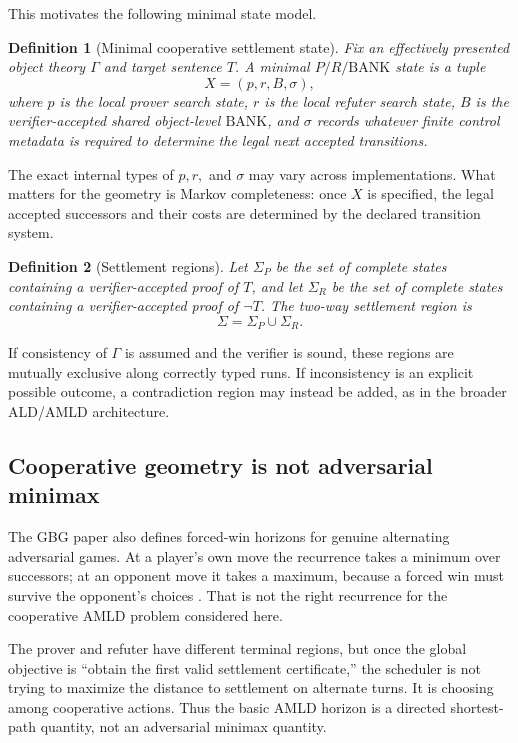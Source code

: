 \documentclass[11pt]{article}
\newtheorem{definition}{Definition}[section]
\theoremstyle{remark}
\newcommand{\BANK}{\ensuremath{\mathrm{BANK}}}
\begin{document}
This motivates the following minimal state model.

\begin{definition}[Minimal cooperative settlement state]
Fix an effectively presented object theory $\Gamma$ and target sentence $T$. A minimal $P/R/\BANK$ state is a tuple
\[
X=(p,r,B,\sigma),
\]
where $p$ is the local prover search state, $r$ is the local refuter search state, $B$ is the verifier-accepted shared object-level \BANK, and $\sigma$ records whatever finite control metadata is required to determine the legal next accepted transitions.
\end{definition}

The exact internal types of $p,r,$ and $\sigma$ may vary across implementations. What matters for the geometry is Markov completeness: once $X$ is specified, the legal accepted successors and their costs are determined by the declared transition system.

\begin{definition}[Settlement regions]
Let $\Sigma_P$ be the set of complete states containing a verifier-accepted proof of $T$, and let $\Sigma_R$ be the set of complete states containing a verifier-accepted proof of $\neg T$. The two-way settlement region is
\[
\Sigma=\Sigma_P\cup\Sigma_R.
\]
\end{definition}

If consistency of $\Gamma$ is assumed and the verifier is sound, these regions are mutually exclusive along correctly typed runs. If inconsistency is an explicit possible outcome, a contradiction region may instead be added, as in the broader ALD/AMLD architecture.

\subsection{Cooperative geometry is not adversarial minimax}

The GBG paper also defines forced-win horizons for genuine alternating adversarial games. At a player's own move the recurrence takes a minimum over successors; at an opponent move it takes a maximum, because a forced win must survive the opponent's choices \cite{TennesonGBG}. That is not the right recurrence for the cooperative AMLD problem considered here.

The prover and refuter have different terminal regions, but once the global objective is ``obtain the first valid settlement certificate,'' the scheduler is not trying to maximize the distance to settlement on alternate turns. It is choosing among cooperative actions. Thus the basic AMLD horizon is a directed shortest-path quantity, not an adversarial minimax quantity.
\end{document}
